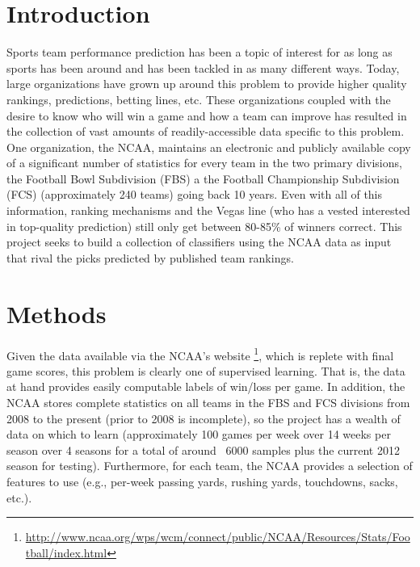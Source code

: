 \documentclass[10pt,letterpaper]{article}
\begin{document}
\maketitle

\section{Introduction}

Sports team performance prediction has been a topic of interest for as long as sports has been around and has been tackled in as many different ways. 
Today, large organizations have grown up around this problem to provide higher quality rankings, predictions, betting lines, etc. 
These organizations coupled with the desire to know who will win a game and how a team can improve has resulted in the collection of vast amounts of readily-accessible data specific to this problem.
One organization, the NCAA, maintains an electronic and publicly available copy of a significant number of statistics for every team in the two primary divisions, the Football Bowl Subdivision (FBS) a the Football Championship Subdivision (FCS) (approximately 240 teams) going back 10 years. 
Even with all of this information, ranking mechanisms and the Vegas line (who has a vested interested in top-quality prediction) still only get between 80-85\% of winners correct.
This project seeks to build a collection of classifiers using the NCAA data as input that rival the picks predicted by published team rankings.

\section{Methods}

Given the data available via the NCAA's website \footnote{\url{http://www.ncaa.org/wps/wcm/connect/public/NCAA/Resources/Stats/Football/index.html}}, which is replete with final game scores, this problem is clearly one of supervised learning.
That is, the data at hand provides easily computable labels of win/loss per game.
In addition, the NCAA stores complete statistics on all teams in the FBS and FCS divisions from 2008 to the present (prior to 2008 is incomplete), so the project has a wealth of data on which to learn (approximately 100 games per week over 14 weeks per season over 4 seasons for a total of around ~6000 samples plus the current 2012 season for testing).
Furthermore, for each team, the NCAA provides a selection of features to use (e.g., per-week passing yards, rushing yards, touchdowns, sacks, etc.).
\end{document}
